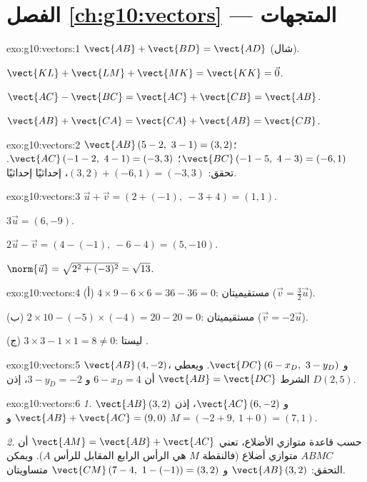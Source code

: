 \section*{الفصل \ref{ch:g10:vectors} --- المتجهات}

\begin{solution}{exo:g10:vectors:1}
$\vect{AB} + \vect{BD} = \vect{AD}$ (شال).

$\vect{KL} + \vect{LM} + \vect{MK} = \vect{KK} = \vec 0$.

$\vect{AC} - \vect{BC} = \vect{AC} + \vect{CB} = \vect{AB}$.

$\vect{AB} + \vect{CA} = \vect{CA} + \vect{AB} = \vect{CB}$.
\end{solution}

\begin{solution}{exo:g10:vectors:2}
$\vect{AB}\,(5-2,\ 3-1) = (3, 2)$؛ \quad
$\vect{BC}\,(-1-5,\ 4-3) = (-6, 1)$؛ \quad
$\vect{AC}\,(-1-2,\ 4-1) = (-3, 3)$.
تحقق: $(3, 2) + (-6, 1) = (-3, 3)$، إحداثيًا إحداثيًا.
\end{solution}

\begin{solution}{exo:g10:vectors:3}
$\vec u + \vec v = (2 + (-1),\ -3 + 4) = (1, 1)$.

$3\vec u = (6, -9)$.

$2\vec u - \vec v = (4 - (-1),\ -6 - 4) = (5, -10)$.

$\norm{\vec u} = \sqrt{2^2 + (-3)^2} = \sqrt{13}$.
\end{solution}

\begin{solution}{exo:g10:vectors:4}
(أ) $4 \times 9 - 6 \times 6 = 36 - 36 = 0$: مستقيميتان
($\vec v = \frac32 \vec u$).

(ب) $2 \times 10 - (-5) \times (-4) = 20 - 20 = 0$: مستقيميتان
($\vec v = -2\vec u$).

(ج) $3 \times 3 - 1 \times 1 = 8 \neq 0$: ليستا .
\end{solution}

\begin{solution}{exo:g10:vectors:5}
$\vect{AB}\,(4, -2)$، و $\vect{DC}\,(6 - x_D,\ 3 - y_D)$. ويعطي الشرط
$\vect{AB} = \vect{DC}$ أن $6 - x_D = 4$ و $3 - y_D = -2$، إذن
$D(2, 5)$.
\end{solution}

\begin{solution}{exo:g10:vectors:6}
\emph{1.} $\vect{AB}\,(3, 2)$ و $\vect{AC}\,(6, -2)$، إذن
$\vect{AB} + \vect{AC} = (9, 0)$ و
$M = (-2 + 9,\ 1 + 0) = (7, 1)$.

\emph{2.} حسب قاعدة متوازي الأضلاع، تعني $\vect{AM} = \vect{AB} + \vect{AC}$
أن $ABMC$ متوازي أضلاع (فالنقطة $M$ هي الرأس الرابع المقابل
للرأس $A$). ويمكن التحقق: $\vect{AB}\,(3,2)$ و $\vect{CM}\,(7-4,\ 1-(-1)) =
(3, 2)$ متساويتان.
\end{solution}

